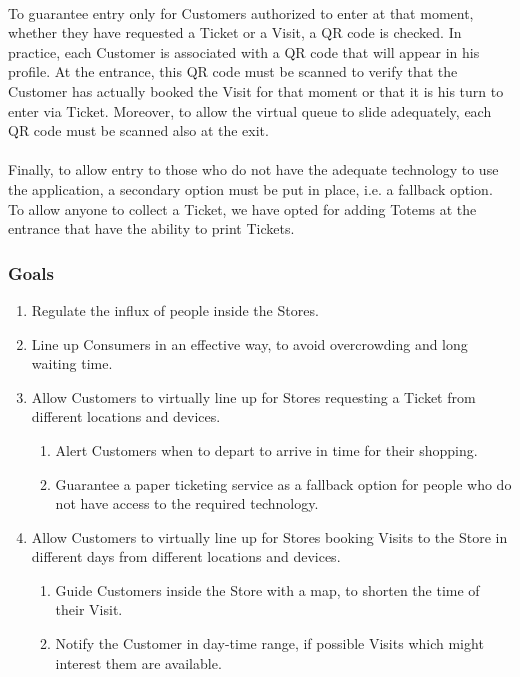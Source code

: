 \documentclass[a4paper, 10pt, oneside]{article}
\begin{document}
\\
To guarantee entry only for Customers authorized to enter at that moment, whether they have requested a Ticket or a Visit, a QR code is checked. In practice, each Customer is associated with a QR code that will appear in his profile. At the entrance, this QR code must be scanned to verify that the Customer has actually booked the Visit for that moment or that it is his turn to enter via Ticket. Moreover, to allow the virtual queue to slide adequately, each QR code must be scanned also at the exit.\\
\\
Finally, to allow entry to those who do not have the adequate technology to use the application, a secondary option must be put in place, i.e. a fallback option. To allow anyone to collect a Ticket, we have opted for adding Totems at the entrance that have the ability to print Tickets.
\newline
\newline
\newline
\subsubsection{Goals}

\begin{enumerate}[label={G.\arabic{*}}]
    \item \label{goal:influx} Regulate the influx of people inside the Stores.
    \item \label{goal:effectiveQueue} Line up Consumers in an effective way, to avoid overcrowding and long waiting time.
    \item \label{goal:enqueue} Allow Customers to virtually line up for Stores requesting a Ticket from different locations and devices.
    \begin{enumerate}[label={\ref{goal:enqueue}.\arabic{*}}]
        \item \label{goal:enqueue:time} Alert Customers when to depart to arrive in time for their shopping.
        \item \label{goal:enqueue:fallback} Guarantee a paper ticketing service as a fallback option for people who do not have access to the required technology.
    \end{enumerate}
    \item \label{goal:visit} Allow Customers to virtually line up for Stores booking Visits to the Store in different days from different locations and devices.
    \begin{enumerate}[label={\ref{goal:visit}.\arabic{*}}]
        \item \label{goal:visit:path} Guide Customers inside the Store with a map, to shorten the time of their Visit.
        \item \label{goal:visit:notifications} Notify the Customer in day-time range, if possible Visits which might interest them are available.
    \end{enumerate}
\end{enumerate}
\end{document}
